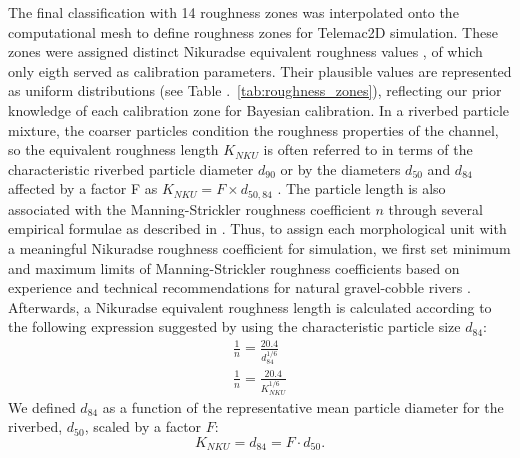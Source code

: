 \documentclass[draft,linenumbers,onecolumn]{agujournal2019} %
\begin{document}
The final classification with 14 roughness zones was interpolated onto the computational mesh to define roughness zones for Telemac2D simulation. These zones were assigned distinct Nikuradse equivalent roughness values , of which only eigth served as calibration parameters. Their plausible values are represented as uniform distributions (see Table .~\ref{tab:roughness_zones}), reflecting our prior knowledge of each calibration zone for Bayesian calibration. In a riverbed particle mixture, the coarser particles condition the roughness properties of the channel, so the equivalent roughness length \( K_{NKU} \) is often referred to in terms of the characteristic riverbed particle diameter \(d_{90}\) or by the diameters \(d_{50}\) and \(d_{84}\) affected by a factor F as \( K_{NKU} = F \times d_{50,84} \) \cite{tassi2023gaia}. The particle length is also associated with the Manning-Strickler roughness coefficient \(n\) through several empirical formulae as described in . Thus, to assign each morphological unit with a meaningful Nikuradse roughness coefficient for simulation, we first set minimum and maximum limits of Manning-Strickler roughness coefficients based on experience and technical recommendations for natural gravel-cobble rivers \cite{chow1959openchannel}. Afterwards, a Nikuradse equivalent roughness length is calculated according to the following expression suggested by \cite{rickenmann2011evaluation} using the characteristic particle size \( d_{84} \):
\begin{gather}
	\frac{1}{n} = \frac{20.4}{d_{84}^{1/6}} \label{eq:mann-NIKU eq-orig} \\
	\frac{1}{n} = \frac{20.4}{K_{NKU}^{1/6}} \label{eq:mann-NIKU eq-d84}
\end{gather}
We defined \( d_{84} \) as a function of the representative mean particle diameter for the riverbed, \( d_{50} \), scaled by a factor \( F \): 
\[
K_{NKU} = d_{84} = F \cdot d_{50}.
\]
\end{document}
